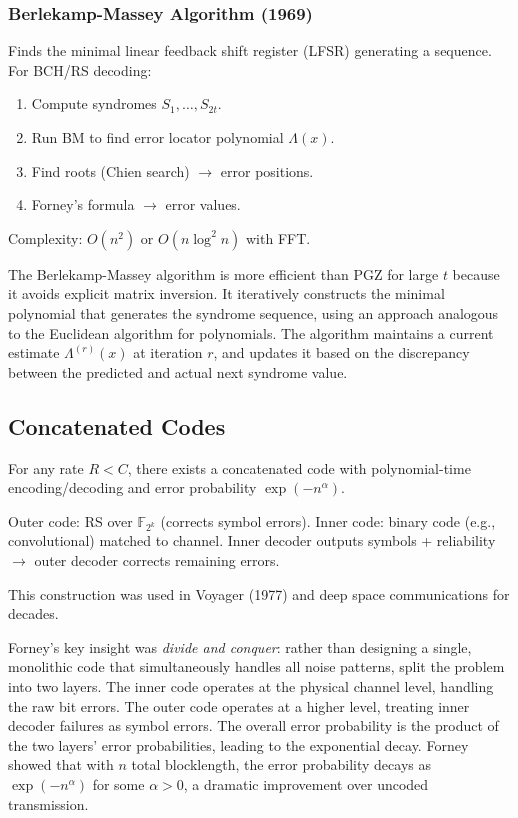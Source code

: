 \subsubsection*{Berlekamp-Massey Algorithm (1969)}
Finds the minimal linear feedback shift register (LFSR) generating a sequence. For BCH/RS decoding:
\begin{enumerate}
\item Compute syndromes $S_1, \dots, S_{2t}$.
\item Run BM to find error locator polynomial $\Lambda(x)$.
\item Find roots (Chien search) $\to$ error positions.
\item Forney's formula $\to$ error values.
\end{enumerate}
Complexity: $O(n^2)$ or $O(n \log^2 n)$ with FFT.

The Berlekamp-Massey algorithm is more efficient than PGZ for large $t$ because it avoids explicit matrix inversion. It iteratively constructs the minimal polynomial that generates the syndrome sequence, using an approach analogous to the Euclidean algorithm for polynomials. The algorithm maintains a current estimate $\Lambda^{(r)}(x)$ at iteration $r$, and updates it based on the discrepancy between the predicted and actual next syndrome value.

\subsection{Concatenated Codes}
\label{sec:ec:concat}

\begin{theorem}[Forney 1966]
For any rate $R < C$, there exists a concatenated code with polynomial-time encoding/decoding and error probability $\exp(-n^\alpha)$.
\end{theorem}

Outer code: RS over $\mathbb{F}_{2^k}$ (corrects symbol errors). Inner code: binary code (e.g., convolutional) matched to channel. Inner decoder outputs symbols + reliability $\to$ outer decoder corrects remaining errors.

This construction was used in Voyager (1977) and deep space communications for decades.

Forney's key insight was \emph{divide and conquer}: rather than designing a single, monolithic code that simultaneously handles all noise patterns, split the problem into two layers. The inner code operates at the physical channel level, handling the raw bit errors. The outer code operates at a higher level, treating inner decoder failures as symbol errors. The overall error probability is the product of the two layers' error probabilities, leading to the exponential decay. Forney showed that with $n$ total blocklength, the error probability decays as $\exp(-n^\alpha)$ for some $\alpha > 0$, a dramatic improvement over uncoded transmission.

